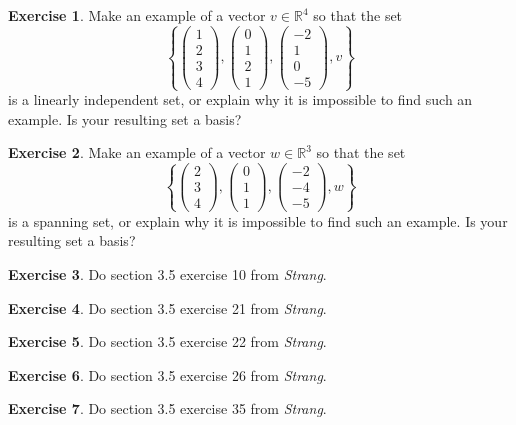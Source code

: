 \documentclass[11pt]{amsart}
\theoremstyle{definition}
\newtheorem{exercise}{Exercise}
\begin{document}
\begin{exercise}
Make an example of a vector $v \in \mathbb{R}^4$ so that the set
\[
\left\{
\begin{pmatrix} 1 \\ 2 \\ 3 \\ 4 \end{pmatrix},
\begin{pmatrix} 0 \\ 1 \\ 2 \\ 1 \end{pmatrix},
\begin{pmatrix} -2\\ 1 \\ 0 \\ -5 \end{pmatrix},
v
\right\}
\]
is a linearly independent set, or explain why it is impossible to find such an example.
Is your resulting set a basis?
\end{exercise}

\begin{exercise}
Make an example of a vector $w \in \mathbb{R}^3$ so that the set
\[
\left\{
\begin{pmatrix} 2 \\ 3 \\ 4 \end{pmatrix},
\begin{pmatrix} 0 \\ 1 \\ 1 \end{pmatrix},
\begin{pmatrix} -2\\ -4 \\ -5 \end{pmatrix},
w
\right\}
\]
is a spanning set, or explain why it is impossible to find such an example. Is your resulting set a basis?
\end{exercise}

\begin{exercise} Do section 3.5 exercise 10 from \emph{Strang}.\end{exercise}
\begin{exercise} Do section 3.5 exercise 21 from \emph{Strang}.\end{exercise}
\begin{exercise} Do section 3.5 exercise 22 from \emph{Strang}.\end{exercise}
\begin{exercise} Do section 3.5 exercise 26 from \emph{Strang}.\end{exercise}
\begin{exercise} Do section 3.5 exercise 35 from \emph{Strang}.\end{exercise}
\end{document}
